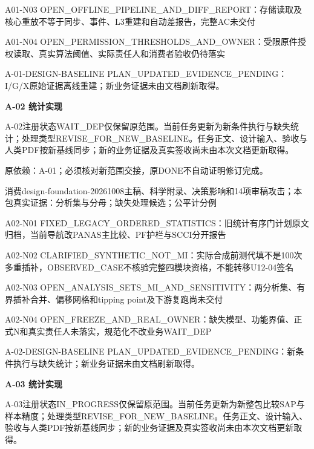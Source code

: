 \documentclass[11pt,a4paper]{article}
\newcommand{\reviewsection}[1]{\par\Needspace{5\baselineskip}\vspace{10pt}\begin{center}{\titlelatin\titlecjk\bfseries\fontsize{14}{20}\selectfont #1}\end{center}}
\begin{document}
A01-\allowbreak{}N03 OPEN\_\allowbreak{}OFFLINE\_\allowbreak{}PIPELINE\_\allowbreak{}AND\_\allowbreak{}DIFF\_\allowbreak{}REPORT：存储读取及核心重放不等于同步、事件、L3重建和自动差报告，完整AC未交付


A01-\allowbreak{}N04 OPEN\_\allowbreak{}PERMISSION\_\allowbreak{}THRESHOLDS\_\allowbreak{}AND\_\allowbreak{}OWNER：受限原件授权读取、真实算法阈值、实际责任人和消费者验收仍待落实


A-\allowbreak{}01-\allowbreak{}DESIGN-\allowbreak{}BASELINE PLAN\_\allowbreak{}UPDATED\_\allowbreak{}EVIDENCE\_\allowbreak{}PENDING：I/\allowbreak{}G/\allowbreak{}X原始证据离线重建；新业务证据未由文档刷新取得。


\reviewsection{A-\allowbreak{}02 统计实现}
A-\allowbreak{}02注册状态WAIT\_\allowbreak{}DEP仅保留原范围。当前任务更新为新条件执行与缺失统计；处理类型REVISE\_\allowbreak{}FOR\_\allowbreak{}NEW\_\allowbreak{}BASELINE。任务正文、设计输入、验收与人类PDF按新基线同步；新的业务证据及真实签收尚未由本次文档更新取得。


原依赖：A-\allowbreak{}01；必须核对新范围交接，原DONE不自动证明修订完成。


消费design-\allowbreak{}foundation-\allowbreak{}20261008主稿、科学附录、决策影响和14项审稿攻击；本包真实证据：分析集与分母；缺失处理候选；公平计分例


A02-\allowbreak{}N01 FIXED\_\allowbreak{}LEGACY\_\allowbreak{}ORDERED\_\allowbreak{}STATISTICS：旧统计有序门计划原文归档，当前导航改PANAS主比较、PF护栏与SCCI分开报告


A02-\allowbreak{}N02 CLARIFIED\_\allowbreak{}SYNTHETIC\_\allowbreak{}NOT\_\allowbreak{}MI：实际合成前测代填不是100次多重插补，OBSERVED\_\allowbreak{}CASE不核验完整四模块资格，不能转移U12-\allowbreak{}04签名


A02-\allowbreak{}N03 OPEN\_\allowbreak{}ANALYSIS\_\allowbreak{}SETS\_\allowbreak{}MI\_\allowbreak{}AND\_\allowbreak{}SENSITIVITY：两分析集、有界插补合并、偏移网格和tipping point及下游复跑尚未交付


A02-\allowbreak{}N04 OPEN\_\allowbreak{}FREEZE\_\allowbreak{}AND\_\allowbreak{}REAL\_\allowbreak{}OWNER：缺失模型、功能界值、正式N和真实责任人未落实，规范化不改业务WAIT\_\allowbreak{}DEP


A-\allowbreak{}02-\allowbreak{}DESIGN-\allowbreak{}BASELINE PLAN\_\allowbreak{}UPDATED\_\allowbreak{}EVIDENCE\_\allowbreak{}PENDING：新条件执行与缺失统计；新业务证据未由文档刷新取得。


\reviewsection{A-\allowbreak{}03 统计实现}
A-\allowbreak{}03注册状态IN\_\allowbreak{}PROGRESS仅保留原范围。当前任务更新为新整包比较SAP与样本精度；处理类型REVISE\_\allowbreak{}FOR\_\allowbreak{}NEW\_\allowbreak{}BASELINE。任务正文、设计输入、验收与人类PDF按新基线同步；新的业务证据及真实签收尚未由本次文档更新取得。
\end{document}

